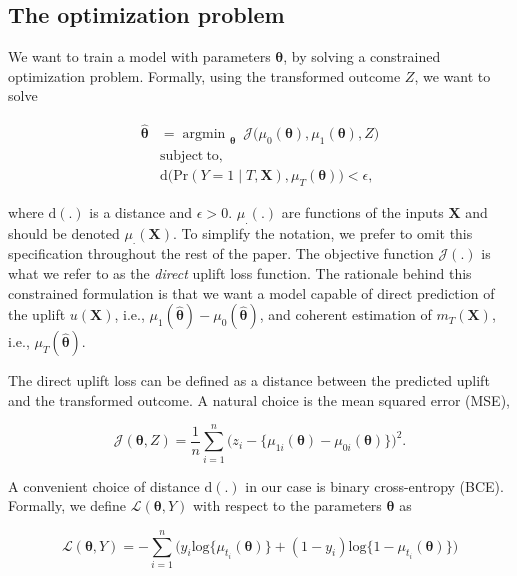 \documentclass{article}
\def\X{\mathbf X}
\DeclareMathOperator*{\argmin}{argmin~} %
\begin{document}


\subsection{The optimization problem}\label{j1}

We want to train a model with parameters $\boldsymbol{\theta}$, by solving a constrained optimization problem. Formally, using the transformed outcome $Z$, we want to solve 

\begin{align} 
     {\boldsymbol{\hat\theta}} & = \argmin_{\boldsymbol{\theta}} ~ \mathcal{J}\Big({\mu_0}(\boldsymbol{\theta}),{\mu_1}(\boldsymbol{\theta}), Z\Big)  \\ 
     & \mathrm{subject~to,} \nonumber \\
        & \mathrm{d}\Big(\mathrm{Pr}(Y=1 \mid T, \X), {\mu_T}(\boldsymbol{\theta}) \Big) < \epsilon,
     \label{eq:objective}
\end{align}

where $\mathrm{d}(.)$ is a distance and $\epsilon > 0$. $\mu_{.}(.)$ are functions of the inputs $\X$ and should be denoted $\mu_{.}(\X)$. To simplify the notation, we prefer to omit this specification throughout the rest of the paper. The objective function $\mathcal{J}(.)$ is what we refer to as the \textit{direct} uplift loss function. The rationale behind this constrained formulation is that we want a model capable of direct prediction of the uplift $u(\X)$, i.e., $\mu_1(\boldsymbol{\hat\theta}) - \mu_0(\boldsymbol{\hat\theta})$, and coherent estimation of $m_T(\X)$, i.e., $\mu_T(\boldsymbol{\hat\theta})$. 


The direct uplift loss can be defined as a distance between the predicted uplift and the transformed outcome. A natural choice is the mean squared error (MSE),

\begin{equation}
    \mathcal{J}(\boldsymbol{\theta}, Z) =   \frac{1}{n} \sum_{i=1}^{n} \Big( z_i - \{{\mu_{1i}}(\boldsymbol{\theta }) - {\mu_{0i}}(\boldsymbol{\theta})\} \Big)^2.
    \label{eq:direct_uplift_loss}
\end{equation}

A convenient choice of distance $\mathrm{d}(.)$ in our case is binary cross-entropy (BCE). Formally, we define $\mathcal{L}(\boldsymbol{\theta}, Y)$ with respect to the parameters $\boldsymbol{\theta}$ as 

\begin{equation*}
    \mathcal{L}(\boldsymbol{\theta}, Y) = - \sum_{i=1}^{n} \Big( y_i\mathrm{log} \{\mu_{t_i}(\boldsymbol{\theta})\} + (1-y_i) \mathrm{log} \{1-\mu_{t_i}(\boldsymbol{\theta})\} \Big)
\end{equation*}
\end{document}
